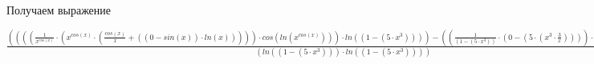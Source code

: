 \documentclass[12pt,a4paper,fleqn]{article}
\begin{document}
 Получаем выражение

$\frac{((((\frac{1}{x^{cos(x)}} \cdot (x^{cos(x)} \cdot (\frac{cos(x)}{x} + ((0 - sin(x)) \cdot ln(x))))) \cdot cos(ln(x^{cos(x)}))) \cdot ln((1 - (5 \cdot x^{3})))) - ((\frac{1}{(1 - (5 \cdot x^{3}))} \cdot (0 - (5 \cdot (x^{3} \cdot \frac{3}{x})))) \cdot sin(ln(x^{cos(x)}))))}{(ln((1 - (5 \cdot x^{3}))) \cdot ln((1 - (5 \cdot x^{3}))))}$
\end{document}
